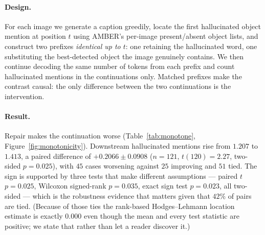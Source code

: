 \documentclass[review,number,doubleblind]{elsarticle}
\theoremstyle{plain}
\theoremstyle{definition}
\theoremstyle{remark}
\begin{document}
\paragraph{Design.}
For each image we generate a caption greedily, locate the first hallucinated object mention
at position $t$ using AMBER's per-image present/absent object lists, and construct two
prefixes \emph{identical up to $t$}: one retaining the hallucinated word, one substituting
the best-detected object the image genuinely contains. We then continue decoding the same
number of tokens from each prefix and count hallucinated mentions in the continuations
only. Matched prefixes make the contrast causal: the only difference between the two
continuations is the intervention.

\paragraph{Result.}
Repair makes the continuation worse (Table~\ref{tab:monotone},
Figure~\ref{fig:monotonicity}). Downstream hallucinated mentions rise from $1.207$ to
$1.413$, a paired difference of $+0.2066\pm0.0908$ ($n=121$, $t(120)=2.27$, two-sided
$p=0.025$), with $45$ cases worsening against $25$ improving and $51$ tied. The sign is
supported by three tests that make different assumptions --- paired $t$ $p=0.025$, Wilcoxon
signed-rank $p=0.035$, exact sign test $p=0.023$, all two-sided --- which is the robustness
evidence that matters given that $42\%$ of pairs are tied. (Because of those ties the
rank-based Hodges--Lehmann location estimate is exactly $0.000$ even though the mean and every
test statistic are positive; we state that rather than let a reader discover it.)
\end{document}
